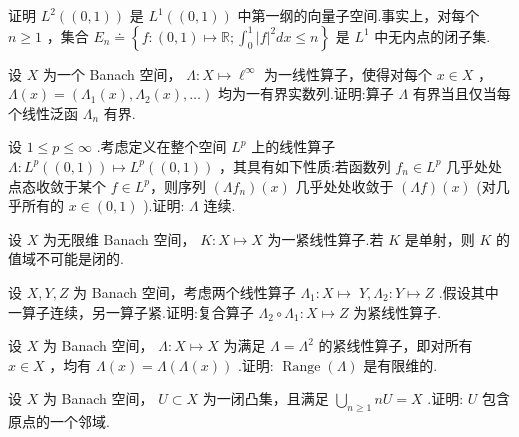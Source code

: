 \begin{rbhw}
证明 ${L}^{2}\left( \left(  {0,1}\right)  \right)$ 是 ${L}^{1}\left( \left(  {0,1}\right)  \right)$ 中第一纲的向量子空间.事实上，对每个 $n \geq  1$ ，集合 ${E}_{n} \doteq  \left\{  {f : \left(  {0,1}\right)   \mapsto  \mathbb{R};{\int }_{0}^{1}{\left| f\right| }^{2}{dx} \leq  n}\right\}$ 是 ${L}^{1}$ 中无内点的闭子集.
\end{rbhw}

\begin{rbhw}
设 $X$ 为一个 Banach 空间， $\Lambda  : X \mapsto  {\ell }^{\infty }$ 为一线性算子，使得对每个 $x \in  X$ ， $\Lambda \left( x\right)  = \left( {{\Lambda }_{1}\left( x\right) ,{\Lambda }_{2}\left( x\right) ,\ldots }\right)$ 均为一有界实数列.证明:算子 $\Lambda$ 有界当且仅当每个线性泛函 ${\Lambda }_{n}$ 有界.
\end{rbhw}

\begin{rbhw}
设 $1 \leq  p \leq  \infty$ .考虑定义在整个空间 ${L}^{p}$ 上的线性算子 $\Lambda  : {L}^{p}\left( \left(  {0,1}\right)  \right)  \mapsto  {L}^{p}\left( \left(  {0,1}\right)  \right)$ ，其具有如下性质:若函数列 ${f}_{n} \in  {L}^{p}$ 几乎处处点态收敛于某个 $f \in  {L}^{p}$，则序列 $\left( {\Lambda {f}_{n}}\right) \left( x\right)$ 几乎处处收敛于 $\left( {\Lambda f}\right) \left( x\right)$ (对几乎所有的 $x \in  \left(  {0,1}\right)$ ).证明: $\Lambda$ 连续.
\end{rbhw}

\begin{rbhw}
设 $X$ 为无限维 Banach 空间， $K : X \mapsto  X$ 为一紧线性算子.若 $K$ 是单射，则 $K$ 的值域不可能是闭的.
\end{rbhw}

\begin{rbhw}
设 $X,Y,Z$ 为 Banach 空间，考虑两个线性算子 ${\Lambda }_{1} : X \mapsto \; Y,{\Lambda }_{2} : Y \mapsto  Z$ .假设其中一算子连续，另一算子紧.证明:复合算子 ${\Lambda }_{2} \circ  {\Lambda }_{1} : X \mapsto  Z$ 为紧线性算子.
\end{rbhw}

\begin{rbhw}
设 $X$ 为 Banach 空间， $\Lambda  : X \mapsto  X$ 为满足 $\Lambda  = {\Lambda }^{2}$ 的紧线性算子，即对所有 $x \in  X$ ，均有 $\Lambda \left( x\right)  = \Lambda \left( {\Lambda \left( x\right) }\right)$ .证明: $\operatorname{Range}\left( \Lambda \right)$ 是有限维的.
\end{rbhw}

\begin{rbhw}
设 $X$ 为 Banach 空间， $U \subset  X$ 为一闭凸集，且满足 $\mathop{\bigcup }\limits_{{n \geq  1}}{nU} = X$ .证明: $U$ 包含原点的一个邻域.
\end{rbhw}

